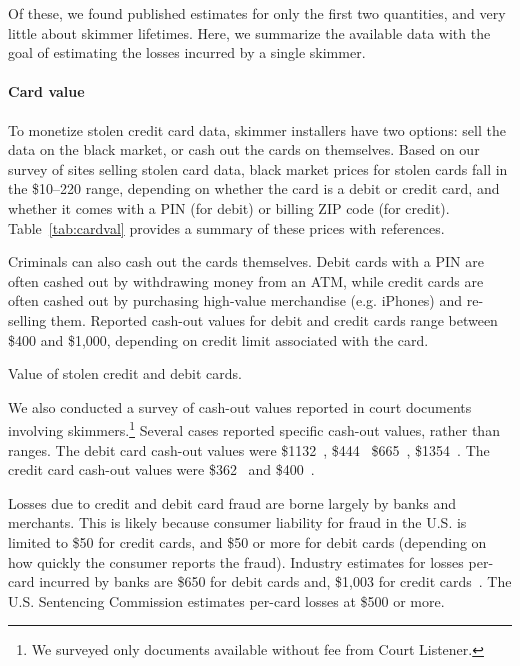 Of these, we found published estimates for only the first two quantities, and very little about skimmer lifetimes. Here, we summarize the available data with the goal of estimating the losses incurred by a single skimmer.

\paragraph{Card value} To monetize stolen credit card data, skimmer installers have two options: sell the data on the black market, or cash out the cards on themselves. Based on our survey of sites selling stolen card data, black market prices for stolen cards fall in the \$10--220 range, depending on whether the card is a debit or credit card, and whether it comes with a PIN (for debit) or billing ZIP code (for credit). Table~\ref{tab:cardval} provides a summary of these prices with references. 



Criminals can also cash out the cards themselves. Debit cards with a PIN are often cashed out by withdrawing money from an ATM, while credit cards are often cashed out by purchasing high-value merchandise (e.g. iPhones) and re-selling them. Reported cash-out values for debit and credit cards range between \$400 and \$1,000, depending on credit limit associated with the card.
%
\begin{table}[!h]
    \centering
    \captionsetup{justification=centering}
\caption{Value of stolen credit and debit cards.}

\label{tab:cardval}
\end{table}
We also conducted a survey of cash-out values reported in court documents involving skimmers.\footnote{We surveyed only documents available without fee from Court Listener.} Several cases reported specific cash-out values, rather than ranges. The debit card cash-out values were \$1132~\cite{hristov}, \$444~\cite{cristea} \$665~\cite{alisuretove}, \$1354~\cite{mekhakian}. The credit card cash-out values were \$362~\cite{aqel} and \$400~\cite{estrada}.

Losses due to credit and debit card fraud are borne largely by banks and merchants. This is likely because consumer liability for fraud in the U.S. is limited to \$50 for credit cards, and \$50 or more for debit cards (depending on how quickly the consumer reports the fraud).  Industry estimates for losses per-card incurred by banks are \$650 for debit cards and, \$1,003 for credit cards~\cite{arizonareport,ATMIA}. The U.S. Sentencing Commission estimates per-card losses at \$500 or more.

